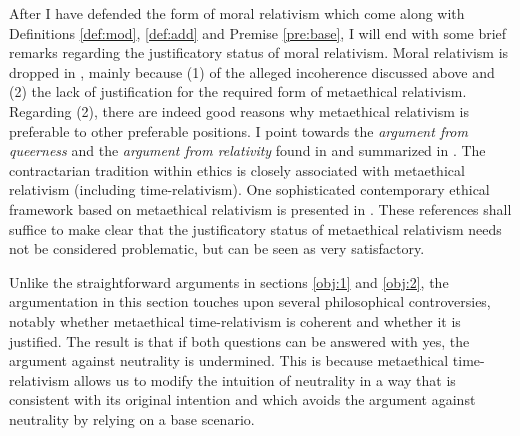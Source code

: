 After I have defended the form of moral relativism which come along with Definitions \ref{def:mod}, \ref{def:add} and Premise \ref{pre:base}, I will end with some brief remarks regarding the justificatory status of moral relativism. Moral relativism is dropped in , mainly because (1) of the alleged incoherence discussed above and (2) the lack of justification for the required form of metaethical relativism. Regarding (2), there are indeed good reasons why metaethical relativism is preferable to other preferable positions. I point towards the \emph{argument from queerness} and the \emph{argument from relativity} found in  and summarized in . The contractarian tradition within ethics is closely associated with metaethical relativism (including time-relativism). One sophisticated contemporary ethical framework based on metaethical relativism is presented in . These references shall suffice to make clear that the justificatory status of metaethical relativism needs not be considered problematic, but can be seen as very satisfactory. 

Unlike the straightforward arguments in sections \ref{obj:1} and \ref{obj:2}, the argumentation in this section touches upon several philosophical controversies, notably whether metaethical time-relativism is coherent and whether it is justified. The result is that if both questions can be answered with yes, the argument against neutrality is undermined. This is because metaethical time-relativism allows us to modify the intuition of neutrality in a way that is consistent with its original intention and which avoids the argument against neutrality by relying on a base scenario. 